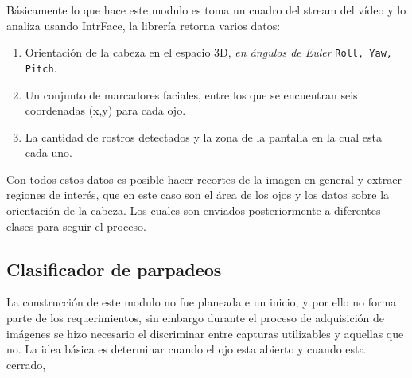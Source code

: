 \documentclass[12pt]{book} %
\begin{document}
		Básicamente lo que hace este modulo es toma un cuadro del stream del vídeo y lo analiza usando IntrFace, la librería retorna varios
		datos:
		\begin{multicols}{2}
			\begin{enumerate}
				\item Orientación de la cabeza en el espacio 3D, \textit{en ángulos de Euler} \texttt{Roll, Yaw, Pitch}.
				\item Un conjunto de marcadores faciales, entre los que se encuentran seis coordenadas (x,y) para cada ojo.
				\item La cantidad de rostros detectados y la zona de la pantalla en la cual esta cada uno.
			\end{enumerate}
		\end{multicols}
		Con todos estos datos es posible hacer recortes de la imagen en general y extraer regiones de interés, que en este caso son el 
		área  de los ojos y los datos sobre la orientación de la cabeza.
		Los cuales son enviados posteriormente a diferentes clases para seguir el proceso.

	\subsection{Clasificador de parpadeos}
		La construcción de este modulo no fue planeada e un inicio, y por ello no forma parte de los requerimientos, sin embargo
		durante el proceso de adquisición de imágenes se hizo necesario el discriminar entre capturas utilizables y aquellas que no.
		La idea básica es determinar cuando el ojo esta abierto y cuando esta cerrado, 
		
\end{document}

